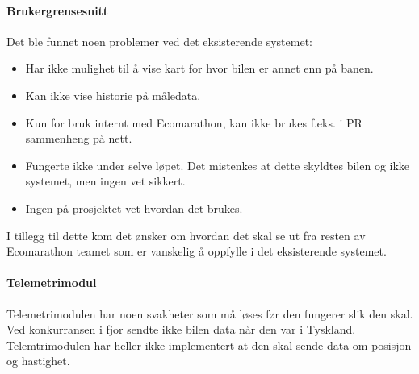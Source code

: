 \paragraph{Brukergrensesnitt}
Det ble funnet noen problemer ved det eksisterende systemet:
\begin{itemize}
\item Har ikke mulighet til å vise kart for hvor bilen er annet enn på banen.
\item Kan ikke vise historie på måledata.
\item Kun for bruk internt med Ecomarathon, kan ikke brukes f.eks. i PR sammenheng på nett.
\item Fungerte ikke under selve løpet. Det mistenkes at dette skyldtes bilen og ikke systemet, men ingen vet sikkert.
\item Ingen på prosjektet vet hvordan det brukes.
\end{itemize}
I tillegg til dette kom det ønsker om hvordan det skal se ut fra resten av Ecomarathon teamet som er vanskelig å oppfylle i det eksisterende systemet.

\paragraph{Telemetrimodul}
Telemetrimodulen har noen svakheter som må løses før den fungerer slik den skal.
Ved konkurransen i fjor sendte ikke bilen data når den var i Tyskland.
Telemtrimodulen har heller ikke implementert at den skal sende data om posisjon og hastighet.